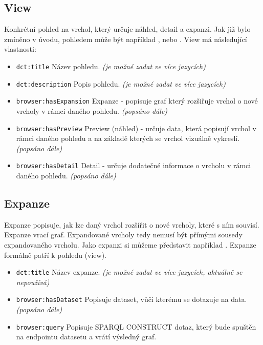 \subsection{View} \label{pozadavky-view}
Konkrétní pohled na vrchol, který určuje náhled, detail a expanzi. Jak již bylo zmíněno v úvodu, pohledem může být například , nebo . View má následující vlastnosti:

\begin{itemize}
    \item \texttt{dct:title} Název pohledu. \textit{(je možné zadat ve více jazycích)}
    \item \texttt{dct:description} Popis pohledu. \textit{(je možné zadat ve více jazycích)}
    \item \texttt{browser:hasExpansion} Expanze -  popisuje graf který rozšiřuje vrchol o nové vrcholy v rámci daného pohledu. \textit{(popsáno dále)}
    \item \texttt{browser:hasPreview} Preview (náhled) - určuje data, která popisují vrchol v rámci daného pohledu a na základě kterých se vrchol vizuálně vykreslí. \textit{(popsáno dále)}
    \item \texttt{browser:hasDetail} Detail - určuje dodatečné informace o vrcholu v rámci daného pohledu. \textit{(popsáno dále)}
\end{itemize}

\subsection{Expanze} \label{pozadavky-expansion}
Expanze popisuje, jak lze daný vrchol rozšířit o nové vrcholy, které s ním souvisí. Expanze vrací graf. Expandované vrcholy tedy nemusí být přímými sousedy expandovaného vrcholu. Jako expanzi si můžeme představit například . Expanze formálně patří k pohledu (view).
\begin{itemize}
    \item \texttt{dct:title} Název expanze. \textit{(je možné zadat ve více jazycích, aktuálně se nepoužívá)}
    \item \texttt{browser:hasDataset} Popisuje dataset, vůči kterému se dotazuje na data. \textit{(popsáno dále)}
    \item \texttt{browser:query} Popisuje SPARQL CONSTRUCT dotaz, který bude spuštěn na endpointu datasetu a vrátí výsledný graf.
\end{itemize}


